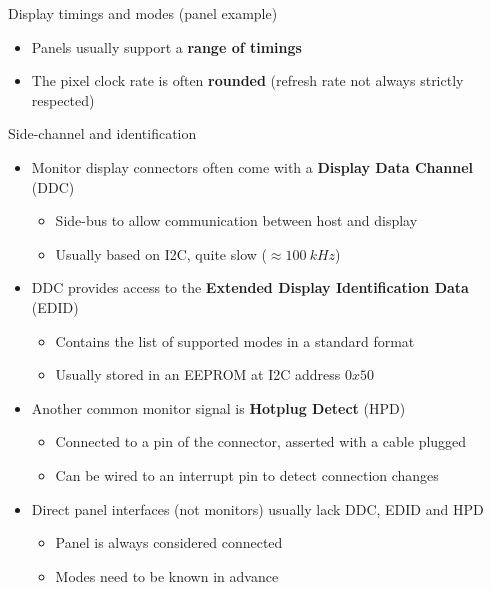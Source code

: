 \begin{frame}{Display timings and modes (panel example)}
  \begin{itemize}
  \item Panels usually support a \textbf{range of timings}
  \item The pixel clock rate is often \textbf{rounded} (refresh rate not always strictly respected)
  \end{itemize}

\end{frame}

\begin{frame}{Side-channel and identification}
  \begin{itemize}
  \item Monitor display connectors often come with a \textbf{Display Data Channel} (DDC)
    \begin{itemize}
    \item Side-bus to allow communication between host and display
    \item Usually based on I2C, quite slow (\(\approx 100~kHz\))
    \end{itemize}
  \item DDC provides access to the \textbf{Extended Display Identification Data} (EDID)
    \begin{itemize}
    \item Contains the list of supported modes in a standard format
    \item Usually stored in an EEPROM at I2C address \(0x50\)
    \end{itemize}
  \item Another common monitor signal is \textbf{Hotplug Detect} (HPD)
    \begin{itemize}
    \item Connected to a pin of the connector, asserted with a cable plugged
    \item Can be wired to an interrupt pin to detect connection changes
    \end{itemize}
  \item Direct panel interfaces (not monitors) usually lack DDC, EDID and HPD
    \begin{itemize}
      \item Panel is always considered connected
      \item Modes need to be known in advance
    \end{itemize}
  \end{itemize}
\end{frame}


